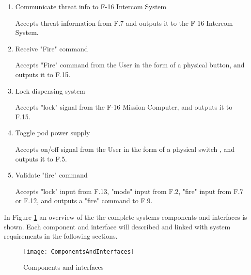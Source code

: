 \documentclass[Main]{subfiles}
\begin{document}
\begin{enumerate}[label=F.\arabic*]
\item Communicate threat info to F-16 Intercom System

Accepts threat information from F.7 and outputs it to the F-16 Intercom System.

\item Receive "Fire" command

Accepts "Fire" command from the User in the form of a physical button, and outputs it to F.15.

\item Lock dispensing system

Accepts "lock" signal from the F-16 Mission Computer, and outputs it to F.15.

\item Toggle pod power supply

Accepts on/off signal from the User in the form of a physical switch , and outputs it to F.5.

\item Validate "fire" command\label{enum:Val}

Accepts "lock" input from F.13, "mode" input from F.2, "fire" input from F.7 or F.12, and outputs a "fire" command to F.9.

\end{enumerate}


In Figure \ref{fig:ComponentsAndInterfaces} an overview of the the complete systems components and interfaces is shown. Each component and interface will described and linked with system requirements in the following sections.

\begin{figure}[H]
\centering
\texttt{[image: ComponentsAndInterfaces]}
\caption{Components and interfaces}
\label{fig:ComponentsAndInterfaces}
\end{figure}


\newpage

\newpage

\end{document}
